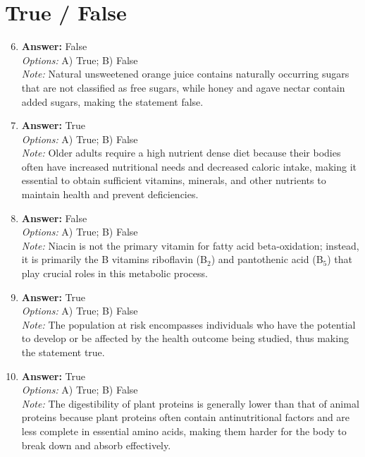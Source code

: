 \documentclass[12pt]{article}
\begin{document}
\section*{True / False}
\begin{enumerate}[label=\arabic*.]
\setcounter{enumi}{5}
\item \textbf{Answer:} False
\\ \textit{Options:} A) True; B) False
\\ \textit{Note:} Natural unsweetened orange juice contains naturally occurring sugars that are not classified as free sugars, while honey and agave nectar contain added sugars, making the statement false.
\item \textbf{Answer:} True
\\ \textit{Options:} A) True; B) False
\\ \textit{Note:} Older adults require a high nutrient dense diet because their bodies often have increased nutritional needs and decreased caloric intake, making it essential to obtain sufficient vitamins, minerals, and other nutrients to maintain health and prevent deficiencies.
\item \textbf{Answer:} False
\\ \textit{Options:} A) True; B) False
\\ \textit{Note:} Niacin is not the primary vitamin for fatty acid beta-oxidation; instead, it is primarily the B vitamins riboflavin (B$_{2}$) and pantothenic acid (B$_{5}$) that play crucial roles in this metabolic process.
\item \textbf{Answer:} True
\\ \textit{Options:} A) True; B) False
\\ \textit{Note:} The population at risk encompasses individuals who have the potential to develop or be affected by the health outcome being studied, thus making the statement true.
\item \textbf{Answer:} True
\\ \textit{Options:} A) True; B) False
\\ \textit{Note:} The digestibility of plant proteins is generally lower than that of animal proteins because plant proteins often contain antinutritional factors and are less complete in essential amino acids, making them harder for the body to break down and absorb effectively.
\end{enumerate}
\end{document}
